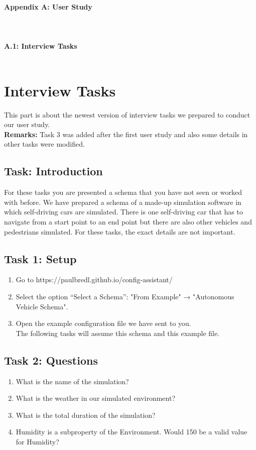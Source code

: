 {\huge \textbf{Appendix A: User Study}}\\\\\\\\  %
{\large \textbf{A.1: Interview Tasks }} \\\\
\section{Interview Tasks}\label{appendix:tasks}
This part is about the newest version of interview tasks we prepared to conduct our user study.\\
\textbf{Remarks:} Task 3 was added after the first user study and also some details in other tasks were modified.
\subsection{Task: Introduction}
For these tasks you are presented a schema that you have not seen or worked with before.
We have prepared a schema of a made-up simulation software in which self-driving cars are simulated.
There is one self-driving car that has to navigate from a start point to an end point but there are also other vehicles and pedestrians simulated.
For these tasks, the exact details are not important.

\subsection{Task 1: Setup}
\begin{enumerate}
    \item Go to https://paulbredl.github.io/config-assistant/
    \item Select the option “Select a Schema”: "From Example" → "Autonomous Vehicle Schema".
    \item Open the example configuration file we have sent to you. \\
          The following tasks will assume this schema and this example file.
\end{enumerate}

\subsection{Task 2: Questions}
\begin{enumerate}
    \item What is the name of the simulation?
    \item What is the weather in our simulated environment?
    \item What is the total duration of the simulation?
    \item Humidity is a subproperty of the Environment. Would 150 be a valid value for Humidity?
\end{enumerate}

